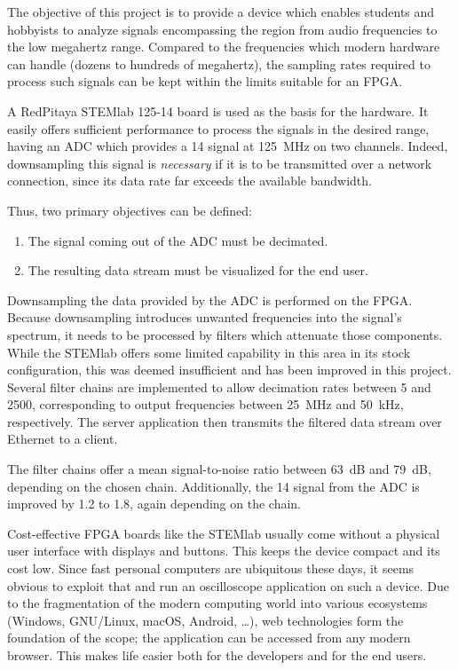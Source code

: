 The  objective  of  this  project  is   to  provide  a  device  which  enables
students and hobbyists  to analyze signals encompassing the  region from audio
frequencies  to the  low megahertz  range. Compared to  the frequencies  which
modern hardware  can handle  (dozens to hundreds  of megahertz),  the sampling
rates required to process such signals  can be kept within the limits suitable
for an FPGA.

A RedPitaya  STEMlab 125-14 board  is used as  the basis for  the hardware. It
easily offers  sufficient performance  to process the  signals in  the desired
range, having an  ADC which provides a \SI{14}{\bit}  signal at \SI{125}{\MHz}
on two channels.   Indeed, downsampling this signal is  \emph{necessary} if it
is  to be  transmitted over  a  network connection,  since its  data rate  far
exceeds the available bandwidth.

Thus, two primary objectives can be defined:
\begin{enumerate}\tightlist
    \item
        The signal coming out of the ADC must be decimated.
    \item
        The resulting data stream must be visualized for the end user.
\end{enumerate}

Downsampling the  data provided by the  ADC is performed on  the FPGA. Because
downsampling introduces  unwanted frequencies  into the signal's  spectrum, it
needs  to be  processed  by filters  which  attenuate those  components. While
the  STEMlab  offers  some  limited  capability in  this  area  in  its  stock
configuration,  this was  deemed insufficient  and has  been improved  in this
project. Several  filter  chains are  implemented  to  allow decimation  rates
between \num{5}  and \num{2500},  corresponding to output  frequencies between
\SI{25}{\MHz}  and \SI{50}{\kHz},  respectively. The  server application  then
transmits the filtered data stream over Ethernet to a client.

The filter chains offer a  mean signal-to-noise ratio between \SI{63}{\dB} and
\SI{79}{\dB}, depending  on the chosen chain. Additionally,  the \SI{14}{\bit}
signal from  the ADC  is improved by  \SI{1.2}{\bit} to  \SI{1.8}{\bit}, again
depending on the chain.

Cost-effective FPGA  boards like the  STEMlab usually come without  a physical
user interface  with displays and  buttons. This keeps the device  compact and
its cost  low.  Since fast  personal computers  are ubiquitous these  days, it
seems obvious  to exploit that and  run an oscilloscope application  on such a
device. Due to  the fragmentation of  the modern computing world  into various
ecosystems (Windows, GNU/Linux, macOS, Android, \ldots), web technologies form
the foundation of  the scope; the application can be  accessed from any modern
browser. This makes life easier both for the developers and for the end users.

